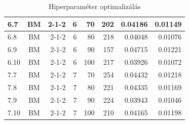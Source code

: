 \documentclass[a4paper, magyar]{article}
\begin{document}
\begin{small}
\begin{table}[tp]
\begin{tabular}{|l|c|r|r|r|r|r|r|}
		\hline
		6.7&BM&2-1-2&6&70&202&0.04186&0.01149\\
		\hline
		6.8&BM&2-1-2&6&80&218&0.04048&0.01076\\
		\hline
		6.9&BM&2-1-2&6&90&157&0.04715&0.01221\\
		\hline
		6.10&BM&2-1-2&6&100&217&0.03926&0.01072\\
		\hline
		7.7&BM&2-1-2&7&70&254&0.04432&0.01218\\
		\hline
		7.8&BM&2-1-2&7&80&221&0.04335&0.01169\\
		\hline
		7.9&BM&2-1-2&7&90&224&0.03943&0.01046\\
		\hline
		7.10&BM&2-1-2&7&100&210&0.04165&0.01198\\
		\hline
	\end{tabular}

	
	\caption{Hiperparaméter optimalizálás}
	\label{tab:optim}
\end{table}
\end{small}
\end{document}

